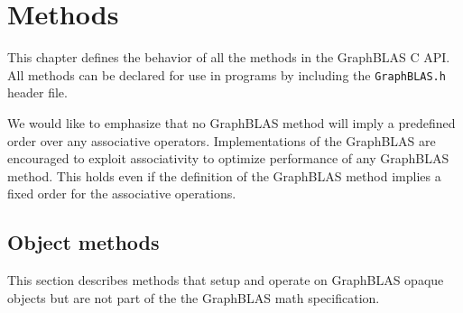 \documentclass[11pt]{extbook}
\begin{document}




\chapter{Methods}
\label{Chp:Methods}

This chapter defines the behavior of all the methods in the GraphBLAS C API.
All methods can be declared for use in programs by including the {\tt GraphBLAS.h} header file.

We would like to emphasize that no GraphBLAS method will imply a predefined order over any associative operators. Implementations of the GraphBLAS are encouraged to exploit associativity to optimize performance of any GraphBLAS method. This holds even if the definition of the GraphBLAS method implies a fixed order for the associative operations.



\section{Object methods}

This section describes methods that setup and operate on GraphBLAS opaque objects
but are not part of the the GraphBLAS math specification.

























\appendix


%
%
\end{document}
